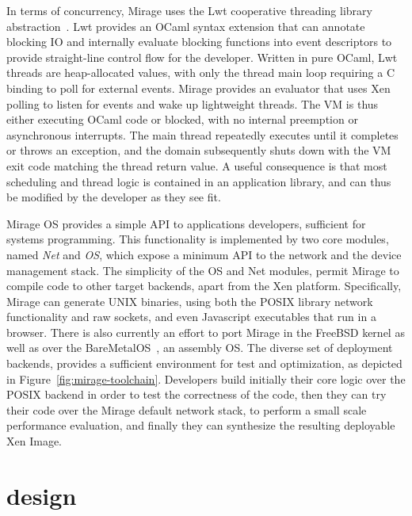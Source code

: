 In terms of concurrency, Mirage uses  the Lwt cooperative threading library
abstraction~\cite{lwt}. Lwt provides an OCaml syntax extension that can annotate
blocking IO and internally evaluate blocking functions into event
descriptors to provide straight-line control ﬂow for the developer.  Written in
pure OCaml, Lwt threads are heap-allocated values, with only the thread main
loop requiring a C binding to poll for external events.  Mirage provides an
evaluator that uses Xen polling to listen for events and wake up lightweight
threads. The VM is thus either executing OCaml code or blocked, with no internal
preemption or asynchronous interrupts. The main thread repeatedly executes until
it completes or throws an exception, and the domain subsequently shuts down with
the VM exit code matching the thread return value.  A useful consequence is that
most scheduling and thread logic is contained in an application library, and can
thus be modified by the developer as they see fit. 

Mirage OS provides a simple API to applications developers, sufficient for
systems programming. This functionality is implemented by two core modules,
named \textit{Net} and \textit{OS}, which expose a minimum API to the network
and the device management stack.  The simplicity of the OS and Net modules,
permit Mirage to compile code to other target backends, apart from the Xen
platform. Specifically, Mirage can generate UNIX binaries, using both the POSIX
library network functionality and raw sockets, and even Javascript executables
that run in a browser. There is also currently an effort to port Mirage in the
FreeBSD kernel as well as over the BareMetalOS~\cite{baremetalOS}, an assembly OS.
The diverse set of deployment backends, provides  a sufficient environment for
test and optimization, as depicted in Figure~\ref{fig:mirage-toolchain}.
Developers build initially their core logic over the POSIX backend in order to
test the correctness of the code, then they can try their code over the Mirage
default network stack, to perform a small scale performance evaluation, and
finally they can synthesize the resulting deployable Xen Image.


\section{\sdnsim design} \label{sec:sdnsim-design}


